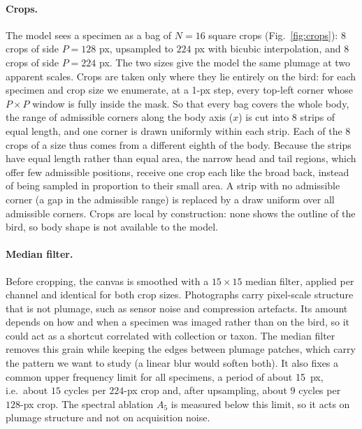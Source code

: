 \paragraph{Crops.}
The model sees a specimen as a bag of $N = 16$ square crops
(Fig.~\ref{fig:crops}): $8$ crops of side $P = 128$ px, upsampled to $224$ px
with bicubic interpolation, and $8$ crops of side $P = 224$ px. The two sizes
give the model the same plumage at two apparent scales. Crops are taken only
where they lie entirely on the bird: for each specimen and crop size we
enumerate, at a 1-px step, every top-left corner whose $P \times P$ window is
fully inside the mask. So that every bag covers the whole body, the range of
admissible corners along the body axis ($x$) is cut into $8$ strips of equal
length, and one corner is drawn uniformly within each strip. Each of the $8$
crops of a size thus comes from a different eighth of the body. Because the
strips have equal length rather than equal area, the narrow head and tail
regions, which offer few admissible positions, receive one crop each like the
broad back, instead of being sampled in proportion to their small area. A strip
with no admissible corner (a gap in the admissible range) is replaced by a draw
uniform over all admissible corners. Crops are local by construction: none shows the outline of
the bird, so body shape is not available to the model.


\paragraph{Median filter.}
Before cropping, the canvas is smoothed with a $15 \times 15$ median filter,
applied per channel and identical for both crop sizes. Photographs carry
pixel-scale structure that is not plumage, such as sensor noise and
compression artefacts. Its amount depends on how and when a specimen was imaged rather than
on the bird, so it could act as a shortcut correlated with collection or
taxon. The median filter removes this grain while keeping the edges between
plumage patches, which carry the pattern we want to study (a linear blur would
soften both). It also fixes a common upper frequency limit for all specimens,
a period of about 15~px, i.e.\ about $15$ cycles per $224$-px crop and, after
upsampling, about $9$ cycles per $128$-px crop. The spectral ablation $A_5$ is
measured below this limit, so it acts on plumage structure and not on
acquisition noise.

